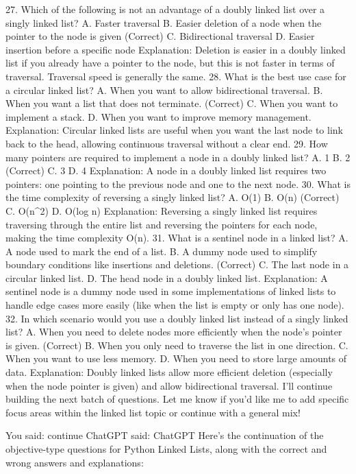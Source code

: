 27. Which of the following is not an advantage of a doubly linked list over a singly linked list?
A. Faster traversal
B. Easier deletion of a node when the pointer to the node is given (Correct)
C. Bidirectional traversal
D. Easier insertion before a specific node
Explanation: Deletion is easier in a doubly linked list if you already have a pointer to the node, but this is not faster in terms of traversal. Traversal speed is generally the same.
28. What is the best use case for a circular linked list?
A. When you want to allow bidirectional traversal.
B. When you want a list that does not terminate. (Correct)
C. When you want to implement a stack.
D. When you want to improve memory management.
Explanation: Circular linked lists are useful when you want the last node to link back to the head, allowing continuous traversal without a clear end.
29. How many pointers are required to implement a node in a doubly linked list?
A. 1
B. 2 (Correct)
C. 3
D. 4
Explanation: A node in a doubly linked list requires two pointers: one pointing to the previous node and one to the next node.
30. What is the time complexity of reversing a singly linked list?
A. O(1)
B. O(n) (Correct)
C. O(n^2)
D. O(log n)
Explanation: Reversing a singly linked list requires traversing through the entire list and reversing the pointers for each node, making the time complexity O(n).
31. What is a sentinel node in a linked list?
A. A node used to mark the end of a list.
B. A dummy node used to simplify boundary conditions like insertions and deletions. (Correct)
C. The last node in a circular linked list.
D. The head node in a doubly linked list.
Explanation: A sentinel node is a dummy node used in some implementations of linked lists to handle edge cases more easily (like when the list is empty or only has one node).
32. In which scenario would you use a doubly linked list instead of a singly linked list?
A. When you need to delete nodes more efficiently when the node's pointer is given. (Correct)
B. When you only need to traverse the list in one direction.
C. When you want to use less memory.
D. When you need to store large amounts of data.
Explanation: Doubly linked lists allow more efficient deletion (especially when the node pointer is given) and allow bidirectional traversal.
I’ll continue building the next batch of questions. Let me know if you’d like me to add specific focus areas within the linked list topic or continue with a general mix!






You said:
continue
ChatGPT said:
ChatGPT
Here’s the continuation of the objective-type questions for Python Linked Lists, along with the correct and wrong answers and explanations:

